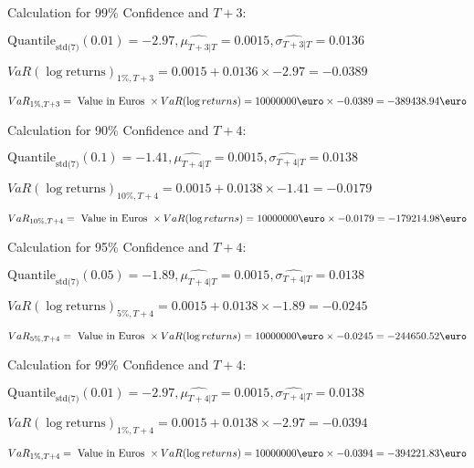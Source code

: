 Calculation for 99\% Confidence and $T+3$:

\indent\indent $\text{Quantile}_\text{std(7)}(0.01) = -2.97,\hat{\mu_{T+3|T}} = 0.0015, \hat{\sigma_{T+3|T}} = 0.0136$

\indent\indent $VaR(\log \text{returns})_{1\%, T + 3} = 0.0015 + 0.0136\times-2.97 = -0.0389$

\indent\indent $VaR_{1\%, T + 3} = \text{ Value in Euros } \times VaR(\log returns) = 10 000 000 \text{\euro} \times-0.0389 = -389438.94 \text{\euro}$\newline




Calculation for 90\% Confidence and $T+4$:

\indent\indent $\text{Quantile}_\text{std(7)}(0.1) = -1.41,\hat{\mu_{T+4|T}} = 0.0015, \hat{\sigma_{T+4|T}} = 0.0138$

\indent\indent $VaR(\log \text{returns})_{10\%, T + 4} = 0.0015 + 0.0138\times-1.41 = -0.0179$

\indent\indent $VaR_{10\%, T + 4} = \text{ Value in Euros } \times VaR(\log returns) = 10 000 000 \text{\euro} \times-0.0179 = -179214.98 \text{\euro}$\newline




Calculation for 95\% Confidence and $T+4$:

\indent\indent $\text{Quantile}_\text{std(7)}(0.05) = -1.89,\hat{\mu_{T+4|T}} = 0.0015, \hat{\sigma_{T+4|T}} = 0.0138$

\indent\indent $VaR(\log \text{returns})_{5\%, T + 4} = 0.0015 + 0.0138\times-1.89 = -0.0245$

\indent\indent $VaR_{5\%, T + 4} = \text{ Value in Euros } \times VaR(\log returns) = 10 000 000 \text{\euro} \times-0.0245 = -244650.52 \text{\euro}$\newline




Calculation for 99\% Confidence and $T+4$:

\indent\indent $\text{Quantile}_\text{std(7)}(0.01) = -2.97,\hat{\mu_{T+4|T}} = 0.0015, \hat{\sigma_{T+4|T}} = 0.0138$

\indent\indent $VaR(\log \text{returns})_{1\%, T + 4} = 0.0015 + 0.0138\times-2.97 = -0.0394$

\indent\indent $VaR_{1\%, T + 4} = \text{ Value in Euros } \times VaR(\log returns) = 10 000 000 \text{\euro} \times-0.0394 = -394221.83 \text{\euro}$\newline
